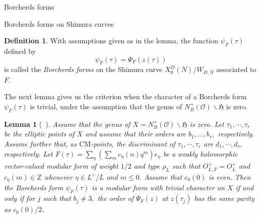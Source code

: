 \documentclass{amsart}
\newcounter{lemma}
\newtheorem{Lemma}[lemma]{Lemma}
\theoremstyle{definition}
\newtheorem{Definition}[lemma]{Definition}
\def\H{\mathfrak H}
\def\nm{\operatorname{nm}}
\def\C{\mathbb C}
\def\O{\mathcal O}
\def\Q{\mathbb Q}
\def\Z{\mathbb Z}
\begin{document}
\begin{section}{Borcherds forms}
\begin{subsection}{Borcherds forms on Shimura curves}

\begin{Definition} \label{definition: Borcherds on Shimura}
With assumptions given as in the lemma, the function $\psi_F(\tau)$
defined by $$\psi_F(\tau)=\Psi_F(z(\tau))$$ is called the
\emph{Borcherds forms} on the Shimura curve $X^D_0(N)/W_{D,N}$
associated to $F$.
\end{Definition}

The next lemma gives us the criterion when the character of a
Borcherds form $\psi_F(\tau)$ is trivial, under the assumption that
the genus of $N^+_B(\O)\backslash\H$ is zero.

\begin{Lemma}[{~\cite[Lemma 6]{Yang-CM}}] \label{lemma: genus 0}
Assume that the genus of $X=N^+_B(\mathcal{O})\backslash\H$ is zero. Let
$\tau_1,\cdots,\tau_r$ be the elliptic points of $X$ and assume that
their orders are $b_1,\ldots,b_r,$ respectively. Assume further that,
as $\mathrm{CM}$-points, the discriminant of $\tau_1,\cdots,\tau_r$
are $d_1,\cdots,d_r,$ respectively. Let $ F(\tau)=\sum_{\eta}\left(
  \sum_{m}c_{\eta}(n)q^m\right){e_{\eta}}$ be a weakly holomorphic
vector-valued modular form of weight ${1}/{2}$ and type $\rho_L$ such
that ${O}^+_{L,F}=O^+_L$ and $c_\eta(m)\in\Z$ whenever $\eta\in
L^\vee/L$ and $m\leq 0$. Assume that $c_0(0)$ is even. Then the
Borcherds form $\psi_F(\tau)$ is a modular form with trivial character
on $X$ if and only if for $j$ such that $b_j\neq 3,$ the order of
$\Psi_F(z)$ at $z(\tau_j)$ has the same parity as $c_0(0)/2$. 
\end{Lemma}



\end{subsection}
\end{section}
\end{document}
